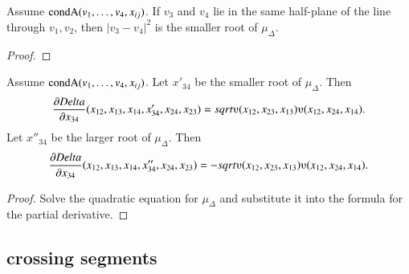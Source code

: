\begin{tarskidata}
\begin{tarski}
\begin{lemma}
Assume ${\operatorname{condA}}(v_1,\ldots,v_4,x_{ij})$.
If $v_3$ and $v_4$ lie in the same half-plane of the line through $v_1,v_2$, then 
 $|v_3-v_4|^2$ is the smaller root of $\mu_\Delta$.
\end{lemma}

\begin{proof}
\end{proof}
\end{tarski}




\begin{tarski}

\begin{lemma}
Assume ${\operatorname{condA}}(v_1,\ldots,v_4,x_{ij})$.
Let $x'_{34}$ be the smaller root
of $\mu_\Delta$.  Then
  $$\frac{\partial\Delta}{\partial x_{34}} (x_{12},x_{13},x_{14},
   x'_{34},x_{24},x_{23}) = 
    \sqrt{\ups(x_{12},x_{23},x_{13}) \ups(x_{12},x_{24},x_{14})}.
  $$
Let $x''_{34}$ be the larger root
of $\mu_\Delta$.  Then
  $$\frac{\partial\Delta}{\partial x_{34}} (x_{12},x_{13},x_{14},
   x''_{34},x_{24},x_{23}) = 
    -\sqrt{\ups(x_{12},x_{23},x_{13}) \ups(x_{12},x_{24},x_{14})}.
  $$
\end{lemma}

\begin{proof} Solve the quadratic equation for $\mu_\Delta$ and substitute
it into the formula for the partial derivative.
\end{proof}
\end{tarski}









\begin{tarski}
\subsection{crossing segments}


\end{tarski}
\end{tarskidata}
